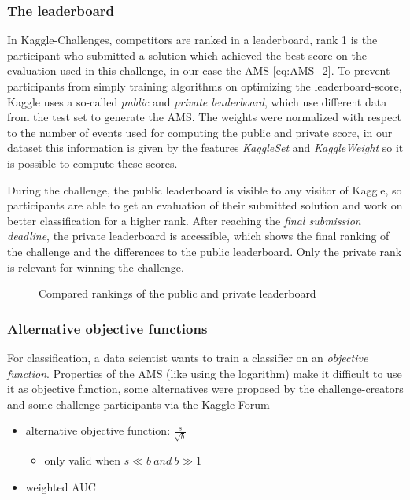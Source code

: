 \subsubsection{The leaderboard}
In Kaggle-Challenges, competitors are ranked in a leaderboard, rank 1 is the participant who submitted a solution which achieved the best score on the evaluation used in this challenge, in our case the AMS \eqref{eq:AMS_2}. To prevent participants from simply training algorithms on optimizing the leaderboard-score, Kaggle uses a so-called \textit{public} and \textit{private leaderboard}, which use different data from the test set to generate the AMS. The weights were normalized with respect to the number of events used for computing the public and private score, in our dataset \cite{higgsData} this information is given by the features \textit{KaggleSet} and \textit{KaggleWeight} so it is possible to compute these scores.


During the challenge, the public leaderboard is visible to any visitor of Kaggle, so participants are able to get an evaluation of their submitted solution and work on better classification for a higher rank.
After reaching the \textit{final submission deadline}, the private leaderboard is accessible, which shows the final ranking of the challenge and the differences to the public leaderboard. Only the private rank is relevant for winning the challenge.

\begin{figure}
	\caption{Compared rankings of the public and private leaderboard}
\end{figure}

\subsubsection{Alternative objective functions}
For classification, a data scientist wants to train a classifier on an \textit{objective function}. Properties of the AMS (like using the logarithm) make it difficult to use it as objective function, some alternatives were proposed by the challenge-creators \cite{higgsPaper} and some challenge-participants via the Kaggle-Forum %

\begin{itemize}
	\item alternative objective function: $ \frac{s}{\sqrt{b}} $
	\begin{itemize}
		\item only valid when $s \ll b \ and \ b \gg 1$
	\end{itemize}
	\item  weighted AUC \cite{diaz14}
\end{itemize}